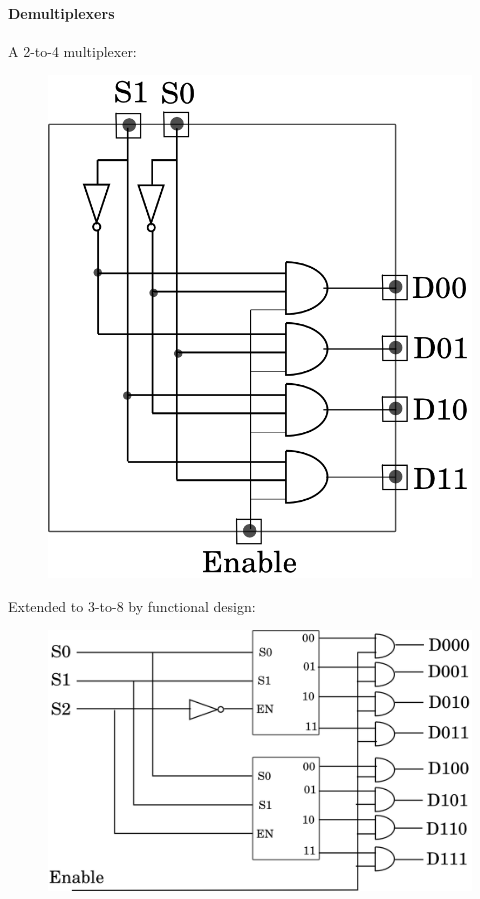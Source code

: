 \documentclass[twocolumn,english]{article}
\begin{document}
\paragraph{Demultiplexers}

A 2-to-4 multiplexer:

\begin{figure}[H]
\noindent \centering{}\includegraphics[width=0.125\paperwidth]{img/dmx4}
\end{figure}


Extended to 3-to-8 by functional design:

\begin{figure}[H]
\noindent \centering{}\includegraphics[width=0.2\paperwidth]{img/dmx8}
\end{figure}
\end{document}
